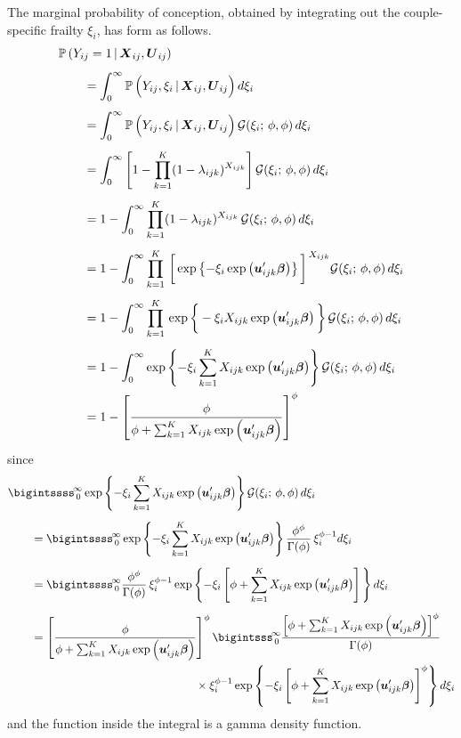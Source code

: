 \documentclass[11pt]{article}
\newcommand{\prob}{\mathbb{P}\,}
\renewcommand{\vec}{\boldsymbol}
\newcommand{\cbar}{\,|\,}
\begin{document}
The marginal probability of conception, obtained by integrating out the couple-specific frailty $\xi_i$, has form as follows.
\begin{align*} \MoveEqLeft
\prob (Y_{ij} = 1 \cbar \vec{X}_{ij}, \vec{U}_{ij}) \\[1ex]
&= \int_0^\infty \prob \Big( Y_{ij}, \xi_i \cbar \vec{X}_{ij}, \vec{U}_{ij} \Big)\, d\xi_i \\[1ex]
&= \int_0^\infty \prob \Big( Y_{ij}, \xi_i \cbar \vec{X}_{ij}, \vec{U}_{ij} \Big)\, \mathcal{G}(\xi_i;\, \phi,\phi)\, d\xi_i \\[1ex]
&= \int_0^\infty \left[ 1 - \prod_{k=1}^K (1 - \lambda_{ijk})^{X_{ijk}} \right] \mathcal{G}(\xi_i;\, \phi,\phi)\, d\xi_i \\[1ex]
&= 1 - \int_0^\infty \prod_{k=1}^K (1 - \lambda_{ijk})^{X_{ijk}}\, \mathcal{G}(\xi_i;\, \phi,\phi)\, d\xi_i \\[1ex]
&= 1 - \int_0^\infty \prod_{k=1}^K\, \bigg[ \exp\left\{ -\xi_i \exp\left( \vec{u}_{ijk}^\prime \vec{\beta} \right)\right\} \bigg]^{\,X_{ijk}} \mathcal{G}(\xi_i;\, \phi,\phi)\, d\xi_i \\[1ex]
&= 1 - \int_0^\infty \prod_{k=1}^K\, \exp\bigg\{ -\xi_i X_{ijk} \exp\left( \vec{u}_{ijk}^\prime \vec{\beta} \right)\bigg\}\, \mathcal{G}(\xi_i;\, \phi,\phi)\, d\xi_i \\[1ex]
&= 1 - \int_0^\infty \exp\left\{ -\xi_i \sum_{k=1}^K X_{ijk} \exp\left( \vec{u}_{ijk}^\prime \vec{\beta} \right)\right\} \mathcal{G}(\xi_i;\, \phi,\phi)\, d\xi_i \\
&= 1 - \left[ \frac{ \phi }{ \phi + \sum_{k=1}^K X_{ijk} \exp\left( \vec{u}_{ijk}^\prime \vec{\beta} \right) } \right]^\phi
\end{align*}
since
\begin{align*} \MoveEqLeft
\bigintssss_{\,0}^{\!\infty} \exp\left\{ -\xi_i \sum_{k=1}^K X_{ijk} \exp\left( \vec{u}_{ijk}^\prime \vec{\beta} \right)\right\} \mathcal{G}(\xi_i;\, \phi,\phi)\, d\xi_i \\[1ex]
&= \bigintssss_{\,0}^{\!\infty} \exp\left\{ -\xi_i \sum_{k=1}^K X_{ijk} \exp\left( \vec{u}_{ijk}^\prime \vec{\beta} \right)\right\} \frac{ \phi^\phi }{ \Gamma(\phi) }\, \xi_i^{\phi-1} d\xi_i \\[1ex]
&= \bigintssss_{\,0}^{\!\infty} \frac{ \phi^\phi }{ \Gamma(\phi) }\, \xi_i^{\phi-1} \exp\left\{ -\xi_i \left[ \phi + \sum_{k=1}^K X_{ijk} \exp\left( \vec{u}_{ijk}^\prime \vec{\beta} \right) \right]\, \right\} d\xi_i \\[1ex]
&= \left[ \frac{ \phi }{ \phi + \sum_{k=1}^K X_{ijk} \exp\left( \vec{u}_{ijk}^\prime \vec{\beta} \right) } \right]^\phi \bigintsss_{\,0}^{\!\infty} \frac{ \left[ \phi + \sum_{k=1}^K X_{ijk} \exp\left( \vec{u}_{ijk}^\prime \vec{\beta} \right) \right]^\phi }{ \Gamma(\phi) } \\
& \hspace{50mm} \times \xi_i^{\phi-1} \exp \left\{ -\xi_i \left[ \phi + \sum_{k=1}^K X_{ijk} \exp\left( \vec{u}_{ijk}^\prime \vec{\beta} \right) \right]^\phi \right\} d\xi_i
\end{align*}
and the function inside the integral is a gamma density function.
\end{document}

